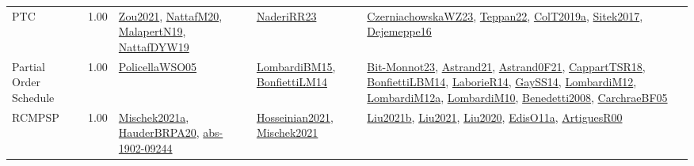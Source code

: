 {\begin{longtable}{p{3cm}r>{\raggedright\arraybackslash}p{6cm}>{\raggedright\arraybackslash}p{6cm}>{\raggedright\arraybackslash}p{8cm}}
\index{PTC}\index{Classification!PTC}PTC &  1.00 & \hyperref[detail:Zou2021]{Zou2021}, \hyperref[detail:NattafM20]{NattafM20}, \hyperref[detail:MalapertN19]{MalapertN19}, \hyperref[detail:NattafDYW19]{NattafDYW19} & \hyperref[detail:NaderiRR23]{NaderiRR23} & \hyperref[detail:CzerniachowskaWZ23]{CzerniachowskaWZ23}, \hyperref[detail:Teppan22]{Teppan22}, \hyperref[detail:ColT2019a]{ColT2019a}, \hyperref[detail:Sitek2017]{Sitek2017}, \hyperref[detail:Dejemeppe16]{Dejemeppe16}\\
\index{Partial Order Schedule}\index{Classification!Partial Order Schedule}Partial Order Schedule &  1.00 & \hyperref[detail:PolicellaWSO05]{PolicellaWSO05} & \hyperref[detail:LombardiBM15]{LombardiBM15}, \hyperref[detail:BonfiettiLM14]{BonfiettiLM14} & \hyperref[detail:Bit-Monnot23]{Bit-Monnot23}, \hyperref[detail:Astrand21]{Astrand21}, \hyperref[detail:Astrand0F21]{Astrand0F21}, \hyperref[detail:CappartTSR18]{CappartTSR18}, \hyperref[detail:BonfiettiLBM14]{BonfiettiLBM14}, \hyperref[detail:LaborieR14]{LaborieR14}, \hyperref[detail:GaySS14]{GaySS14}, \hyperref[detail:LombardiM12]{LombardiM12}, \hyperref[detail:LombardiM12a]{LombardiM12a}, \hyperref[detail:LombardiM10]{LombardiM10}, \hyperref[detail:Benedetti2008]{Benedetti2008}, \hyperref[detail:CarchraeBF05]{CarchraeBF05}\\
\index{RCMPSP}\index{Classification!RCMPSP}RCMPSP &  1.00 & \hyperref[detail:Mischek2021a]{Mischek2021a}, \hyperref[detail:HauderBRPA20]{HauderBRPA20}, \hyperref[detail:abs-1902-09244]{abs-1902-09244} & \hyperref[detail:Hosseinian2021]{Hosseinian2021}, \hyperref[detail:Mischek2021]{Mischek2021} & \hyperref[detail:Liu2021b]{Liu2021b}, \hyperref[detail:Liu2021]{Liu2021}, \hyperref[detail:Liu2020]{Liu2020}, \hyperref[detail:EdisO11a]{EdisO11a}, \hyperref[detail:ArtiguesR00]{ArtiguesR00}\\

\end{longtable}}
